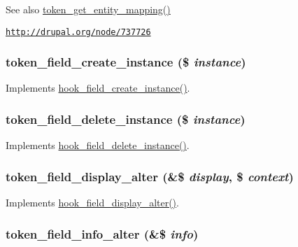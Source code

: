 \begin{DoxySeeAlso}{See also}
\hyperlink{token_8module_a44ada8bf0431313606adce0148b29b82}{token\_\-get\_\-entity\_\-mapping()} 

\href{http://drupal.org/node/737726}{\tt http://drupal.org/node/737726} 
\end{DoxySeeAlso}
\hypertarget{token_8module_a33b88bb88f338a9d37ea10b260caac36}{
\subsubsection[{token\_\-field\_\-create\_\-instance}]{\setlength{\rightskip}{0pt plus 5cm}token\_\-field\_\-create\_\-instance (\$ {\em instance})}}
\label{token_8module_a33b88bb88f338a9d37ea10b260caac36}
Implements \hyperlink{group__field__crud_ga199cb6235866c98ab74a6680bb00b17a}{hook\_\-field\_\-create\_\-instance()}. \hypertarget{token_8module_aabb4f403262fe33845a9644fef38feb4}{
\subsubsection[{token\_\-field\_\-delete\_\-instance}]{\setlength{\rightskip}{0pt plus 5cm}token\_\-field\_\-delete\_\-instance (\$ {\em instance})}}
\label{token_8module_aabb4f403262fe33845a9644fef38feb4}
Implements \hyperlink{group__field__crud_gae351ac9408b7c2e8bfefd9ebca5ab7f5}{hook\_\-field\_\-delete\_\-instance()}. \hypertarget{token_8module_a27b0b8c059ec8a469a124e574ac1a9bc}{
\subsubsection[{token\_\-field\_\-display\_\-alter}]{\setlength{\rightskip}{0pt plus 5cm}token\_\-field\_\-display\_\-alter (\&\$ {\em display}, \/  \$ {\em context})}}
\label{token_8module_a27b0b8c059ec8a469a124e574ac1a9bc}
Implements \hyperlink{group__field__storage_ga7a5d4e018902a0072d5de819bbc7c409}{hook\_\-field\_\-display\_\-alter()}. \hypertarget{token_8module_af9c21176f345bfcac32fc7628f06bc1a}{
\subsubsection[{token\_\-field\_\-info\_\-alter}]{\setlength{\rightskip}{0pt plus 5cm}token\_\-field\_\-info\_\-alter (\&\$ {\em info})}}
